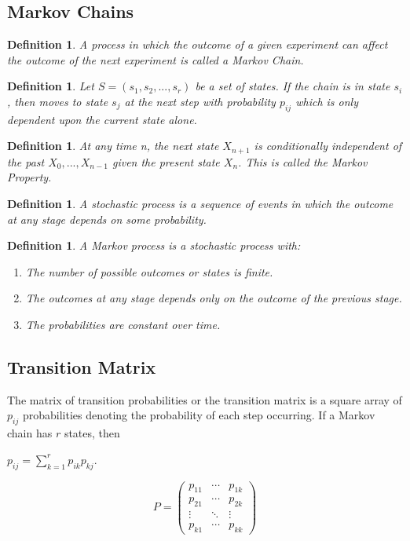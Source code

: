 \documentclass[11pt,a4paper]{article}
\theoremstyle{plain}
\newtheorem{de}[fact]{Definition}
\begin{document}
\subsection{\bf Markov Chains} 
\begin{de}
A process in which the outcome of a given experiment can affect the outcome of the next experiment is called a Markov Chain.
\end{de}


\begin{de}
Let $S =(s_1,s_2,...,s_r)$ be a set of states. If the chain is in state $s_i$, then moves to state $s_j$ at the next step with probability $p_{ij}$ which is only dependent upon the current state alone.
\end{de}


\begin{de}
At any time n, the next state $X_{n+1}$ is conditionally independent of the past $X_0,...,X_{n-1}$ given the present state $X_n$. This is called the Markov Property.
\end{de}


\begin{de}
A stochastic process is a sequence of events in which the outcome at any stage depends on some probability. 
\end{de}
\begin{de}
A Markov process is a stochastic process with:
\begin{enumerate}
\item {The number of possible outcomes or states is finite.}
\item {The outcomes at any stage depends only on the outcome of the previous stage.}
\item {The probabilities are constant over time.}
\end{enumerate}
\end{de} 




\subsection*{Transition Matrix}
The matrix of transition probabilities or the transition matrix is a square array of $p_{ij}$ probabilities  denoting the probability of each step occurring. If a Markov chain has $r$ states, then  
\begin{center}
$p_{ij}=\displaystyle\sum_{k=1}^r$$p_{ik}p_{kj}$.
\end{center}
$$
P=
\begin{pmatrix} 
p_{11} & \cdots & p_{1k}\\
p_{21} & \cdots & p_{2k}\\
\vdots & \ddots & \vdots\\
p_{k1} & \cdots & p_{kk}
\end{pmatrix}
$$
\end{document}

